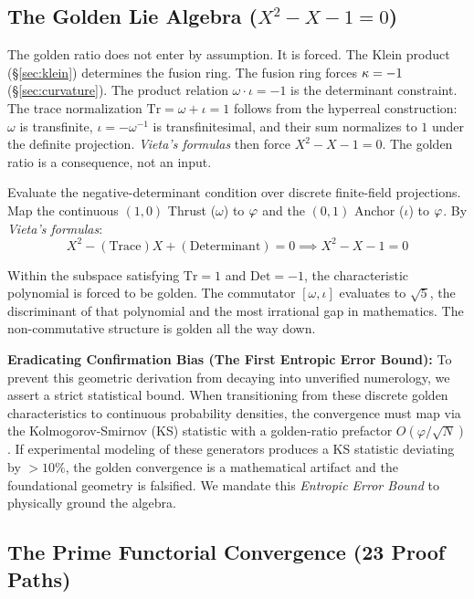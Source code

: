 \subsection{The Golden Lie Algebra (\texorpdfstring{$X^2 - X - 1 = 0$}{X^2 - X - 1 = 0})}\label{sec:golden_lie}

The golden ratio does not enter by assumption. It is forced. The Klein product (\S\ref{sec:klein}) determines the fusion ring. The fusion ring forces $\kappa = -1$ (\S\ref{sec:curvature}). The product relation $\omega \cdot \iota = -1$ is the determinant constraint. The trace normalization $\mathrm{Tr} = \omega + \iota = 1$ follows from the hyperreal construction: $\omega$ is transfinite, $\iota = -\omega^{-1}$ is transfinitesimal, and their sum normalizes to $1$ under the definite projection. \emph{Vieta's formulas} then force $X^2 - X - 1 = 0$. The golden ratio is a consequence, not an input.

Evaluate the negative-determinant condition over discrete finite-field projections. Map the continuous $(1,0)$ Thrust ($\omega$) to $\varphi$ and the $(0,1)$ Anchor ($\iota$) to $\varphi$. By \emph{Vieta's formulas}:
$$X^2 - (\text{Trace})X + (\text{Determinant}) = 0 \implies X^2 - X - 1 = 0$$

Within the subspace satisfying $\mathrm{Tr} = 1$ and $\mathrm{Det} = -1$, the characteristic polynomial is forced to be golden. The commutator $[\omega, \iota]$ evaluates to $\sqrt{5}$, the discriminant of that polynomial and the most irrational gap in mathematics. The non-commutative structure is golden all the way down.

\textbf{Eradicating Confirmation Bias (The First Entropic Error Bound):} To prevent this geometric derivation from decaying into unverified numerology, we assert a strict statistical bound. When transitioning from these discrete golden characteristics to continuous probability densities, the convergence must map via the Kolmogorov-Smirnov (KS) statistic with a golden-ratio prefactor $O(\varphi / \sqrt{N})$. If experimental modeling of these generators produces a KS statistic deviating by $>10\%$, the golden convergence is a mathematical artifact and the foundational geometry is falsified. We mandate this \emph{Entropic Error Bound} to physically ground the algebra.

\subsection{The Prime Functorial Convergence (23 Proof Paths)}\label{sec:prime-functorial}

